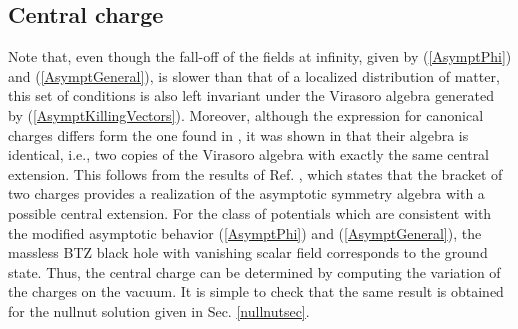 \documentclass[a4paper,12pt]{article}
\begin{document}
\subsection{Central charge}

Note that, even though the fall-off of the fields at infinity, given by 
(\ref{AsymptPhi}) and (\ref{AsymptGeneral}), is slower than that of a localized
distribution of matter, this set of conditions is also left invariant under
the Virasoro algebra generated by (\ref{AsymptKillingVectors}). Moreover,
although the expression for canonical charges differs form the one found in 
\cite{Brown-Henneaux}, it was shown in \cite{HMTZ} that their algebra is
identical, i.e., two copies of the Virasoro algebra with exactly the same
central extension. This follows from the results of Ref. \cite
{Brown:ed}, which states that the bracket of two charges provides a
realization of the asymptotic symmetry algebra with a possible central
extension. For the class of potentials which are consistent with the
modified asymptotic behavior (\ref{AsymptPhi}) and (\ref{AsymptGeneral}), the
massless BTZ black hole with vanishing scalar field corresponds to the
ground state. Thus, the central charge can be determined by computing the
variation of the charges on the vacuum. It is simple to check that the same
result is obtained for the nullnut solution given in Sec. \ref{nullnutsec}.
\end{document}
